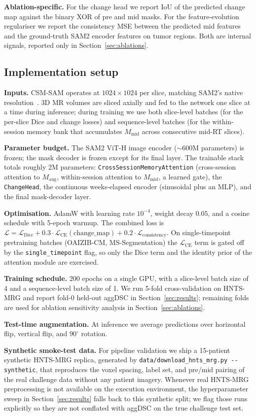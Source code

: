 \textbf{Ablation-specific.} For the change head we report IoU of the
predicted change map against the binary XOR of pre and mid masks. For
the feature-evolution regulariser we report the consistency MSE
between the predicted mid features and the ground-truth SAM2 encoder
features on tumor regions. Both are internal signals, reported only
in Section~\ref{sec:ablations}.

\subsection{Implementation setup}
\label{sec:exp_impl}

\textbf{Inputs.} CSM-SAM operates at $1024 \times 1024$ per slice,
matching SAM2's native resolution~\cite{ravi2024sam2}. 3D MR volumes
are sliced axially and fed to the network one slice at a time during
inference; during training we use both slice-level batches (for the
per-slice Dice and change losses) and sequence-level batches (for the
within-session memory bank that accumulates $M_{\text{mid}}$ across
consecutive mid-RT slices).

\textbf{Parameter budget.} The SAM2 ViT-H image encoder
(${\sim}600$M parameters) is frozen; the mask decoder is frozen except
for its final layer. The trainable stack totals roughly 2M
parameters: \texttt{CrossSessionMemoryAttention} (cross-session
attention to $M_{\text{aug}}$, within-session attention to
$M_{\text{mid}}$, a learned gate), the \texttt{ChangeHead}, the
continuous weeks-elapsed encoder (sinusoidal plus an MLP), and the
final mask-decoder layer.

\textbf{Optimisation.} AdamW with learning rate $10^{-4}$, weight
decay $0.05$, and a cosine schedule with 5-epoch warmup. The combined
loss is $\mathcal{L} = \mathcal{L}_{\text{Dice}} +
0.3 \cdot \mathcal{L}_{\text{CE}}(\text{change\_map}) +
0.2 \cdot \mathcal{L}_{\text{consistency}}$. On single-timepoint
pretraining batches (OAIZIB-CM, MS-Segmentation) the
$\mathcal{L}_{\text{CE}}$ term is gated off by the
\texttt{single\_timepoint} flag, so only the Dice term and the
identity prior of the attention module are exercised.

\textbf{Training schedule.} 200 epochs on a single GPU, with a
slice-level batch size of 4 and a sequence-level batch size of 1. We
run 5-fold cross-validation on HNTS-MRG and report fold-0 held-out
aggDSC in Section~\ref{sec:results}; remaining folds are used for
ablation sensitivity analysis in Section~\ref{sec:ablations}.

\textbf{Test-time augmentation.} At inference we average predictions
over horizontal flip, vertical flip, and $90^{\circ}$ rotation.

\textbf{Synthetic smoke-test data.} For pipeline validation we ship a
15-patient synthetic HNTS-MRG replica, generated by
\texttt{data/download\_hnts\_mrg.py -{}-synthetic}, that reproduces
the voxel spacing, label set, and pre/mid pairing of the real
challenge data without any patient imagery. Whenever real HNTS-MRG
preprocessing is not available on the execution environment, the
hyperparameter sweep in Section~\ref{sec:results} falls back to this
synthetic split; we flag those runs explicitly so they are not
conflated with aggDSC on the true challenge test set.

